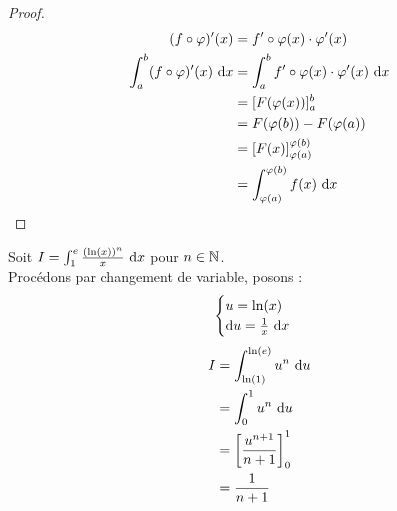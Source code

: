 \begin{proof}
    \begin{align*}
        (f \circ \varphi)'(x) &= f' \circ \varphi(x) \cdot \varphi'(x) \\
        \int_a^b (f \circ \varphi)'(x) \ \diffd x &= \int_a^b f' \circ \varphi(x)  \cdot \varphi'(x) \ \diffd x \\
         &= [F(\varphi(x))]_a^b \\
         &= F(\varphi(b)) - F(\varphi(a)) \\
         &= [F(x)]_{\varphi(a)}^{\varphi(b)} \\
         &= \int_{\varphi(a)}^{\varphi(b)} f(x) \ \diffd x 
    \end{align*}
\end{proof}

\begin{example}
	Soit $I = \int_{1}^{e} \frac{(\ln(x))^n}{x} \ \diffd x$ pour $n \in \mathbb{N}$.
	\\
	Procédons par changement de variable, posons :
	\[
	\begin{cases}
		u = \ln(x) \\
		\diffd u = \frac{1}{x} \ \diffd x
	\end{cases}
	\]
	\begin{align*}
		I &= \int_{\ln(1)}^{\ln(e)} u^n \ \diffd u \\
		  &= \int_{0}^{1} u^n \ \diffd u \\
		  &= \left[ \frac{u^{n+1}}{n+1} \right]_0^1 \\
		  &= \frac{1}{n + 1}
	\end{align*}
\end{example}


